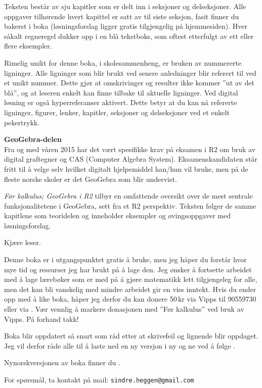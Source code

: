 Teksten består av sju kapitler som er delt inn i seksjoner og delseksjoner. Alle oppgaver tilhørende hvert kapittel er satt av til siste seksjon, fasit finner du bakerst i boka (løsningsforslag ligger gratis tilgjengelig på hjemmesiden). Hver såkalt regneregel dukker opp i en blå tekstboks, som oftest etterfulgt av ett eller flere eksempler.\vsk

Rimelig unikt for denne boka, i skolesammenheng, er bruken av nummererte ligninger. Alle ligninger som blir brukt ved senere anledninger blir referert til ved et unikt nummer. Dette gjør at omskrivinger og resulter ikke kommer ''ut av det blå'', og at leseren enkelt kan finne tilbake til aktuelle ligninger. Ved digital lesning er også hyperreferanser aktivert. Dette betyr at du kan nå refererte ligninger, figurer, lenker, kapitler, seksjoner og delseksjoner ved et enkelt pekertrykk.\vsk

\textbf{GeoGebra-delen}\\
Fra og med våren 2015 har det vært spesifikke krav på eksamen i R2 om bruk av digital graftegner og CAS (Computer Algebra System). Eksamenskandidaten står fritt til å velge selv hvilket digitalt hjelpemiddel han/hun vil bruke, men på de fleste norske skoler er det GeoGebra som blir undervist. \vsk

\textit{Før kalkulus; GeoGebra i R2} tilbyr en omfattende oversikt over de mest sentrale funksjonalitetene i GeoGebra, sett fra et R2 perspektiv. Teksten følger de samme kapitlene som teoridelen og inneholder eksempler og øvingsoppgaver med løsningsforslag.
\newpage
\begin{tcolorbox}[boxrule=0.0 mm,arc=0mm,enhanced jigsaw,breakable,colback=yellow!12]
Kjære leser. \vsk

Denne boka er i utgangspunktet gratis å bruke, men jeg håper du forstår hvor mye tid og ressurser jeg har brukt på å lage den. Jeg ønsker å fortsette arbeidet med å lage lærebøker som er med på å gjøre matematikk lett tilgjengeleg for alle, men det kan bli vanskelig med mindre arbeidet gir en viss inntekt. Hvis du ender opp med å like boka, håper jeg derfor du kan donere 50\,kr via Vipps til 90559730 eller via . Vær vennlig å markere donasjonen med ''Før kalkulus'' ved bruk av Vipps. På forhand takk! \vsk

Boka blir oppdatert så snart som råd etter at skrivefeil og lignende blir oppdaget. Jeg vil derfor råde alle til å laste ned en ny versjon i ny og ne ved å følge .\vsk

Nynorskversjonen av boka finner du .\vsk

For spørsmål, ta kontakt på mail: \tt{sindre.heggen@gmail.com} 
 \end{tcolorbox}
